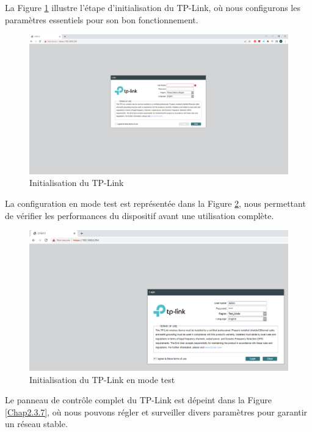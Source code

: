 La Figure \ref{Chap2.3.5} illustre l'étape d'initialisation du TP-Link, où nous configurons  les paramètres essentiels pour son bon fonctionnement.

\begin{figure}[H]
\centering
\includegraphics[width=15cm]{Images/tplink3.png}
\caption{Initialisation du TP-Link}
\label{Chap2.3.5}
\end{figure}

La configuration en mode test est représentée dans la Figure \ref{Chap2.3.6}, nous permettant de vérifier les performances du dispositif avant une utilisation complète.

\begin{figure}[H]
\centering
\includegraphics[width=15cm]{Images/tplink33.png}
\caption{Initialisation du TP-Link en mode test}
\label{Chap2.3.6}
\end{figure}

Le panneau de contrôle complet du TP-Link est dépeint dans la Figure \ref{Chap2.3.7}, où nous pouvons régler et surveiller divers paramètres pour garantir un réseau stable.


